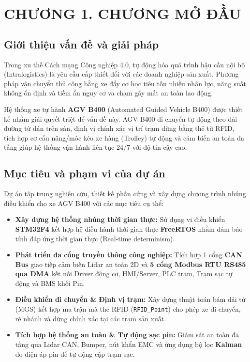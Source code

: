 \documentclass{article}
\begin{document}
\newpage

\clearpage
\section*{CHƯƠNG 1. CHƯƠNG MỞ ĐẦU}

\setcounter{section}{1}
\setcounter{subsection}{0}

\subsection{Giới thiệu vấn đề và giải pháp}
Trong xu thế Cách mạng Công nghiệp 4.0, tự động hóa quá trình hậu cần nội bộ (Intralogistics) là yêu cầu cấp thiết đối với các doanh nghiệp sản xuất. Phương pháp vận chuyển thủ công bằng xe đẩy cơ học tiêu tốn nhiều nhân lực, năng suất không ổn định và tiềm ẩn nguy cơ va chạm gây mất an toàn lao động.

Hệ thống xe tự hành \textbf{AGV B400} (Automated Guided Vehicle B400) được thiết kế nhằm giải quyết triệt để vấn đề này. AGV B400 di chuyển tự động theo dải đường từ dán trên sàn, định vị chính xác vị trí trạm dừng bằng thẻ từ RFID, tích hợp cơ cấu nâng/móc kéo xe hàng (Trolley) tự động và cảm biến an toàn đa tầng giúp hệ thống vận hành liên tục 24/7 với độ tin cậy cao.

\subsection{Mục tiêu và phạm vi của dự án}
Dự án tập trung nghiên cứu, thiết kế phần cứng và xây dựng chương trình nhúng điều khiển cho xe AGV B400 với các mục tiêu cụ thể:
\begin{itemize}
    \item \textbf{Xây dựng hệ thống nhúng thời gian thực:} Sử dụng vi điều khiển \textbf{STM32F4} kết hợp hệ điều hành thời gian thực \textbf{FreeRTOS} nhằm đảm bảo tính đáp ứng thời gian thực (Real-time determinism).
    \item \textbf{Phát triển đa cổng truyền thông công nghiệp:} Tích hợp 1 cổng \textbf{CAN Bus} giao tiếp cảm biến Lidar an toàn 2D và \textbf{5 cổng Modbus RTU RS485 qua DMA} kết nối Driver động cơ, HMI/Server, PLC trạm, Trạm sạc tự động và BMS khối Pin.
    \item \textbf{Điều khiển di chuyển \& Định vị trạm:} Xây dựng thuật toán bám dải từ (MGS) kết hợp ma trận mã thẻ RFID (\texttt{RFID\_Point}) cho phép xe di chuyển, rẽ nhánh và dừng chính xác tại các trạm sản xuất.
    \item \textbf{Tích hợp hệ thống an toàn \& Tự động sạc pin:} Giám sát an toàn đa tầng qua Lidar CAN, Bumper, nút khẩn EMC và ứng dụng bộ lọc \textbf{Kalman} đo điện áp pin để tự động cập trạm sạc.
\end{itemize}
\end{document}
